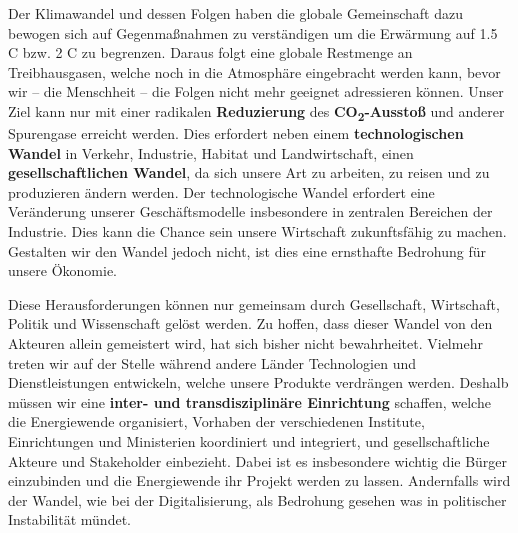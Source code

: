 
\noindent
Der Klimawandel und dessen Folgen haben die globale Gemeinschaft dazu bewogen sich auf Gegenmaßnahmen zu verständigen um die Erwärmung auf 1.5 \degree{}C bzw. 2 \degree{}C zu begrenzen.
Daraus folgt eine globale Restmenge an Treibhausgasen, welche noch in die Atmosphäre eingebracht werden kann, bevor wir -- die Menschheit -- die Folgen nicht mehr geeignet adressieren können.
%
Unser Ziel kann nur mit einer radikalen \textbf{Reduzierung} des \textbf{CO\textsubscript{2}-Ausstoß} und anderer Spurengase erreicht werden.
Dies erfordert neben einem \textbf{technologischen Wandel} in Verkehr, Industrie, Habitat und Landwirtschaft, einen \textbf{gesellschaftlichen Wandel}, da sich unsere Art zu arbeiten, zu reisen und zu produzieren ändern werden.
Der technologische Wandel erfordert eine Veränderung unserer Geschäftsmodelle insbesondere in zentralen Bereichen der Industrie.
Dies kann die Chance sein unsere Wirtschaft zukunftsfähig zu machen.
Gestalten wir den Wandel jedoch nicht, ist dies eine ernsthafte Bedrohung für unsere Ökonomie.

Diese Herausforderungen können nur gemeinsam durch Gesellschaft, Wirtschaft, Politik und Wissenschaft gelöst werden.
Zu hoffen, dass dieser Wandel von den Akteuren allein gemeistert wird, hat sich bisher nicht bewahrheitet.
Vielmehr treten wir auf der Stelle während andere Länder Technologien und Dienstleistungen entwickeln, welche unsere Produkte verdrängen werden. 
Deshalb müssen wir eine \textbf{inter- und transdisziplinäre Einrichtung} schaffen, welche die Energiewende organisiert, Vorhaben der verschiedenen Institute, Einrichtungen und Ministerien koordiniert und integriert, und gesellschaftliche Akteure und Stakeholder einbezieht.
Dabei ist es insbesondere wichtig die Bürger einzubinden und die Energiewende ihr Projekt werden zu lassen.
Andernfalls wird der Wandel, wie bei der Digitalisierung, als Bedrohung gesehen was in politischer Instabilität mündet.

